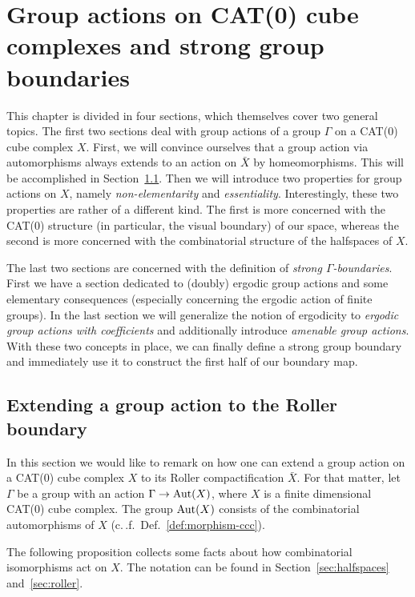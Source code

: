 \section{Group actions on CAT(0) cube complexes and strong group boundaries}
\label{sec:group}
This chapter is divided in four sections, which themselves cover two general topics. The first two sections deal with group actions of a group \(\Gamma\) on a CAT(0) cube complex \(X\). First, we will convince ourselves that a group action via automorphisms always extends to an action on \(\bar X\) by homeomorphisms. This will be accomplished in Section~\ref{sec:ga-roller}. Then we will introduce two properties for group actions on \(X\), namely \emph{non-elementarity} and \emph{essentiality}. Interestingly, these two properties are rather of a different kind. The first is more concerned with the CAT(0) structure (in particular, the visual boundary) of our space, whereas the second is more concerned with the combinatorial structure of the halfspaces of \(X\).

The last two sections are concerned with the definition of \emph{strong \(\Gamma\)-boundaries}. First we have a section dedicated to (doubly) ergodic group actions and some elementary consequences (especially concerning the ergodic action of finite groups). In the last section we will generalize the notion of ergodicity to \emph{ergodic group actions with coefficients} and additionally introduce \emph{amenable group actions}. With these two concepts in place, we can finally define a strong group boundary and immediately use it to construct the first half of our boundary map.

\subsection{Extending a group action to the Roller boundary}
\label{sec:ga-roller}

In this section we would like to remark on how one can extend a group action on a CAT(0) cube complex \(X\) to its Roller compactification \(\bar X\). For that matter, let \(\Gamma\) be a group with an action \(\Gamma \to \operatorname{Aut}(X)\), where \(X\) is a finite dimensional CAT(0) cube complex. The group \(\operatorname{Aut}(X)\) consists of the combinatorial automorphisms of \(X\) (c.\,.f.\ Def.~\ref{def:morphism-ccc}).

The following proposition collects some facts about how combinatorial isomorphisms act on \(X\). The notation can be found in Section~\ref{sec:halfspaces} and~\ref{sec:roller}.

